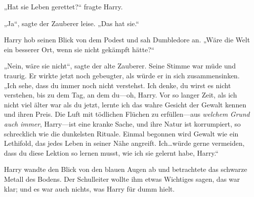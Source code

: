 „Hat sie Leben gerettet?“ fragte Harry.

„Ja“, sagte der Zauberer leise. „Das hat sie.“

Harry hob seinen Blick von dem Podest und sah Dumbledore an. „Wäre die Welt ein besserer Ort, wenn sie nicht gekämpft hätte?“

„Nein, wäre sie nicht“, sagte der alte Zauberer. Seine Stimme war müde und traurig. Er wirkte jetzt noch gebeugter, als würde er in sich zusammensinken. „Ich sehe, dass du immer noch nicht verstehst. Ich denke, du wirst es nicht verstehen, bis zu dem Tag, an dem du—oh, Harry. Vor so langer Zeit, als ich nicht viel älter war als du jetzt, lernte ich das wahre Gesicht der Gewalt kennen und ihren Preis. Die Luft mit tödlichen Flüchen zu erfüllen—aus \emph{welchem Grund auch immer}, Harry—ist eine kranke Sache, und ihre Natur ist korrumpiert, so schrecklich wie die dunkelsten Rituale. Einmal begonnen wird Gewalt wie ein Lethifold, das jedes Leben in seiner Nähe angreift. Ich…würde gerne vermeiden, dass du diese Lektion so lernen musst, wie ich sie gelernt habe, Harry.“

Harry wandte den Blick von den blauen Augen ab und betrachtete das schwarze Metall des Bodens. Der Schulleiter wollte ihm etwas Wichtiges sagen, das war klar; und es war auch nichts, was Harry für dumm hielt.

